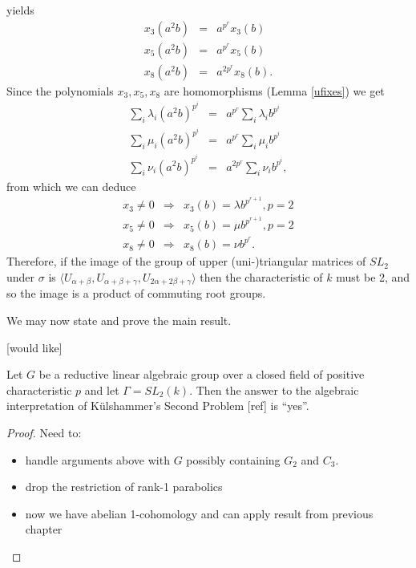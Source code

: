 \begin{example}
	yields
	\begin{eqnarray*}
		x_3(a^2b) &=& a^{p^r}x_3(b)\\
		x_5(a^2b) &=& a^{p^r}x_5(b)\\
		x_8(a^2b) &=& a^{2p^r}x_8(b).
	\end{eqnarray*}
	Since the polynomials $x_3, x_5, x_8$ are homomorphisms (Lemma \ref{ufixes}) we get
	\begin{eqnarray*}
		\sum_i \lambda_i (a^2b)^{p^i} &=& a^{p^r} \sum_i \lambda_i b^{p^i}\\
		\sum_i \mu_i (a^2b)^{p^i} &=& a^{p^r} \sum_i \mu_i b^{p^i}\\
		\sum_i \nu_i (a^2b)^{p^i} &=& a^{2p^r} \sum_i \nu_i b^{p^i},
	\end{eqnarray*}
	from which we can deduce
	\begin{eqnarray*}
		x_3 \neq 0 &\Longrightarrow& x_3(b) = \lambda b^{p^{r+1}}, p = 2\\
		x_5 \neq 0 &\Longrightarrow& x_5(b) = \mu b^{p^{r+1}}, p = 2\\
		x_8 \neq 0 &\Longrightarrow& x_8(b) = \nu b^{p^r}.
	\end{eqnarray*}
	Therefore, if the image of the group of upper (uni-)triangular matrices of $SL_2$ under $\sigma$ is $\langle U_{\alpha+\beta}, U_{\alpha+\beta+\gamma}, U_{2\alpha+2\beta+\gamma} \rangle$ then the characteristic of $k$ must be 2, and so the image is a product of commuting root groups.
\end{example}

We may now state and prove the main result.

[would like]
\begin{theorem}
	Let $G$ be a reductive linear algebraic group over a closed field of positive characteristic $p$ and let $\Gamma = SL_2(k)$. Then the answer to the algebraic interpretation of K\"ulshammer's Second Problem [ref] is ``yes''.
\end{theorem}
\begin{proof}
	Need to:
	\begin{itemize}
		\item handle arguments above with $G$ possibly containing $G_2$ and $C_3$.
		\item drop the restriction of rank-1 parabolics
		\item now we have abelian 1-cohomology and can apply result from previous chapter
	\end{itemize}
\end{proof}

